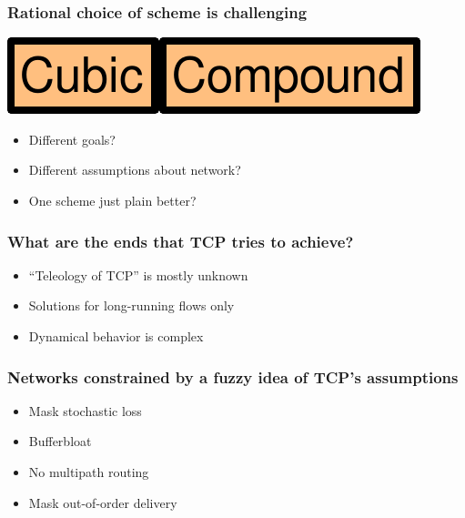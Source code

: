 \documentclass[svgnames]{beamer}
\newcommand{\ssline}{\vspace{8 pt}}
\begin{document}
\begin{frame}
\frametitle{Rational choice of scheme is challenging}

\begin{centering}
\includegraphics[height=20 pt]{cubic.pdf}\hspace{8 pt}{\bf vs.}\hspace{8 pt}\includegraphics[height=20 pt]{compound.pdf}

\end{centering}

\ssline
\ssline
\ssline

\begin{itemize}

\Large

\item Different goals?

\item Different assumptions about network?

\item One scheme just plain better?

\end{itemize}

\end{frame}

\begin{frame}
\frametitle{What are the ends that TCP tries to achieve?}

\begin{itemize}

\Large

\item ``Teleology of TCP'' is mostly unknown

\item Solutions for long-running flows only

\item Dynamical behavior is complex

\end{itemize}

\end{frame}

\begin{frame}
\frametitle{Networks constrained by a fuzzy idea of TCP's assumptions}

\Large

\begin{itemize}
\item Mask stochastic loss
\item Bufferbloat
\item No multipath routing
\item Mask out-of-order delivery
\end{itemize}

\end{frame}
\end{document}
